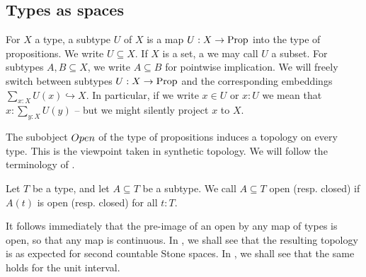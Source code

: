 \subsection{Types as spaces}
\begin{remark}
  For $X$ a type, a subtype $U$ of $X$ is a map $U:X\to\mathrm{Prop}$ 
  into the type of propositions. %
  We write $U\subseteq X$.
  If $X$ is a set, a we may call $U$ a subset. %
  For subtypes $A,B\subseteq X$, we write $A\subseteq B$ for pointwise implication.
  We will freely switch between subtypes $U:X\to\mathrm{Prop}$ and the corresponding embeddings
  $
    \sum_{x:X}U(x) \hookrightarrow  X.
  $
In particular, if we write $x\in U$ or $x:U$ 
we mean that $x:\sum_{y:X}U(y)$ -- but we might silently project $x$ to $X$.
\end{remark}


The subobject $\Open$ of the type of propositions induces a topology on every type. 
This is the viewpoint taken in synthetic topology. 
We will follow the terminology of \cite{SyntheticTopologyEscardo, SyntheticTopologyLesnik}. 

\begin{definition}
  Let $T$ be a type, and let $A\subseteq T$ be a subtype. 
  We call $A\subseteq T$ open (resp. closed) if $A(t)$ is open (resp. closed) for all $t:T$.
\end{definition}

\begin{remark}
  It follows immediately that the pre-image of an open by any map of types is open, so that any map is continuous. 
  In , we shall see that the resulting topology is as expected for second countable Stone spaces.
  In , we shall see that the same holds for the unit interval. 
\end{remark}



